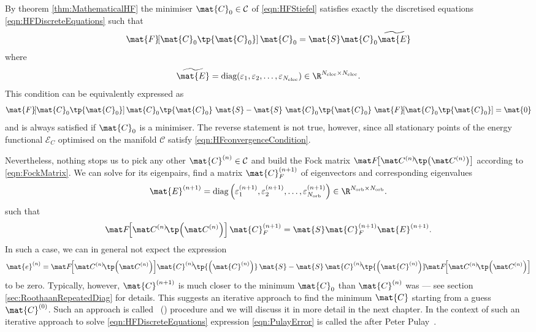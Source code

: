 \begin{rem}
\label{rem:PropertiesDiscretised}
By theorem \vref{thm:MathematicalHF}
the minimiser $\mat{C}_0 \in \mathcal{C}$ of \eqref{eqn:HFStiefel}
satisfies exactly the discretised \HF equations \eqref{eqn:HFDiscreteEquations}
such that
\newcommand{\matFzfull}{\mat{F}\!\!\left[\mat{C}_0\tp{\mat{C}_0}\right]}
\[
	\matFzfull \mat{C}_0 = \mat{S} \mat{C}_0 \widetilde{\mat{E}}
\]
where
\[
	\widetilde{\mat{E}} = \text{diag}(\varepsilon_1, \varepsilon_2, \ldots,
		\varepsilon_{\Nelec}) \in \R^{\Nelec \times \Nelec}.
\]
This condition can be equivalently expressed as~\cite{Pulay1982}
\begin{equation}
	\matFzfull \mat{C}_0\tp{\mat{C}_0} \
	\mat{S} - \mat{S} \ \mat{C}_0\tp{\mat{C}_0} \ \matFzfull
	= \mat{0}
	\label{eqn:HFconvergenceCondition}
\end{equation}
and is always satisfied if $\mat{C}_0$ is a minimiser.
The reverse statement is not true, however,
since all stationary points of the energy functional
$\mathcal{E}_C$ optimised on the manifold $\mathcal{C}$
satisfy \eqref{eqn:HFconvergenceCondition}.

Nevertheless, nothing stops us to pick any other $\mat{C}^{(n)} \in \mathcal{C}$
and build the Fock matrix $\matFnfull$
according to \eqref{eqn:FockMatrix}.
We can solve for its eigenpairs, \ie find a matrix $\mat{C}_F^{(n+1)}$
of eigenvectors and corresponding eigenvalues
\[
	\mat{E}^{(n+1)}
	= \text{diag}\left(\varepsilon_1^{(n+1)},
	\varepsilon_2^{(n+1)}, \ldots,
	\varepsilon_{\Norb}^{(n+1)}\right) \in \R^{\Norb \times \Norb}.
\]
such that
\begin{equation}
	\matFnfull \mat{C}_F^{(n+1)} = \mat{S} \mat{C}_F^{(n+1)} \mat{E}^{(n+1)}.
	\label{eqn:HFiterated}
\end{equation}
In such a case, we can in general not expect the expression
\begin{equation}
	\mat{e}^{(n)}
	= \matFnfull \! \mat{C}^{(n)}\!\tp{\left(\mat{C}^{(n)}\right)} \, \mat{S}
	- \mat{S} \, \mat{C}^{(n)}\!\tp{\left(\mat{C}^{(n)}\right)} \! \matFnfull
	\label{eqn:PulayError}
\end{equation}
to be zero.
Typically, however, $\mat{C}^{(n+1)}$ is
much closer to the minimum $\mat{C}_0$ than $\mat{C}^{(n)}$
was --- see section \vref{sec:RoothaanRepeatedDiag} for details.
This suggests an iterative approach to find the minimum $\mat{C}$
starting from a guess $\mat{C}^{(0)}$.
Such an approach is called ~(\SCF) procedure
and we will discuss it in more detail in the next chapter.
In the context of such an iterative approach
to solve \eqref{eqn:HFDiscreteEquations}
expression \eqref{eqn:PulayError} is called the 
after Peter Pulay~\cite{Pulay1982}.


\end{rem}
